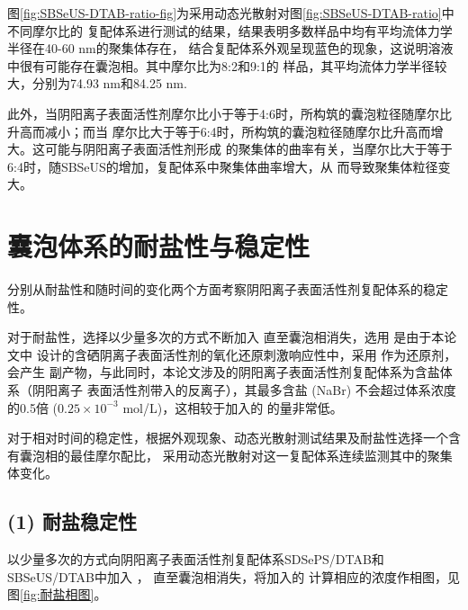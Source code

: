 \documentclass[bachelor,winfonts,replaceperiod]{jnuthesis}
\begin{document}
    图\ref{fig:SBSeUS-DTAB-ratio-fig}为采用动态光散射对图\ref{fig:SBSeUS-DTAB-ratio}中不同摩尔比的
    复配体系进行测试的结果，结果表明多数样品中均有平均流体力学半径在40-60 nm的聚集体存在，
    结合复配体系外观呈现蓝色的现象，这说明溶液中很有可能存在囊泡相。其中摩尔比为8:2和9:1的
    样品，其平均流体力学半径较大，分别为74.93 nm和84.25 nm.
    
    此外，当阴阳离子表面活性剂摩尔比小于等于4:6时，所构筑的囊泡粒径随摩尔比升高而减小；而当
    摩尔比大于等于6:4时，所构筑的囊泡粒径随摩尔比升高而增大。这可能与阴阳离子表面活性剂形成
    的聚集体的曲率有关，当摩尔比大于等于6:4时，随SBSeUS的增加，复配体系中聚集体曲率增大，从
    而导致聚集体粒径变大\cite{杨成成2017}。
    
    \section{囊泡体系的耐盐性与稳定性}
    分别从耐盐性和随时间的变化两个方面考察阴阳离子表面活性剂复配体系的稳定性。
    
    对于耐盐性，选择以少量多次的方式不断加入 直至囊泡相消失，选用 是由于本论文中
    设计的含硒阴离子表面活性剂的氧化还原刺激响应性中，采用 作为还原剂，会产生
    副产物，与此同时，本论文涉及的阴阳离子表面活性剂复配体系为含盐体系（阴阳离子
    表面活性剂带入的反离子），其最多含盐 (NaBr) 不会超过体系浓度的0.5倍 ($0.25 \times 10^{-3}$ mol/L)，这相较于加入的  的量非常低。
    
    对于相对时间的稳定性，根据外观现象、动态光散射测试结果及耐盐性选择一个含有囊泡相的最佳摩尔配比，
    采用动态光散射对这一复配体系连续监测其中的聚集体变化。
    
    \subsection*{(1) 耐盐稳定性}
    以少量多次的方式向阴阳离子表面活性剂复配体系SDSePS/DTAB和SBSeUS/DTAB中加入 ，
    直至囊泡相消失，将加入的 计算相应的浓度作相图，见图\ref{fig:耐盐相图}。
\end{document}
